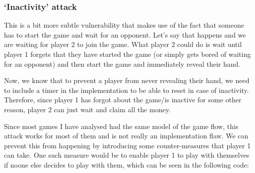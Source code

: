 \documentclass{article}
\begin{document}
    \subsubsection{`Inactivity' attack} \label{s:playown}
    This is a bit more subtle vulnerability that makes use
    of the fact that someone has to start the game and wait
    for an opponent. Let's say that happens and we are
    waiting for player 2 to join the game. What player 2
    could do is wait until player 1 forgets that they have
    started the game (or simply gets bored of waiting for an
    opponent) and then start the game and immediately reveal
    their hand.
    \newline

    \noindent Now, we know that to prevent a player from
    never revealing their hand, we need to include a timer
    in the implementation to be able to reset in case of
    inactivity. Therefore, since player 1 has forgot about
    the game/is inactive for some other reason, player 2
    can just wait and claim all the money.
    \newline
    
    \noindent Since most games I have analysed had the same
    model of the game flow, this attack works for most of
    them and is not really an implementation flaw. We can
    prevent this from happening by introducing some
    counter-measures that player 1 can take. One such
    measure would be to enable player 1 to play with
    themselves if noone else decides to play with them,
    which can be seen in the following code:
\end{document}
